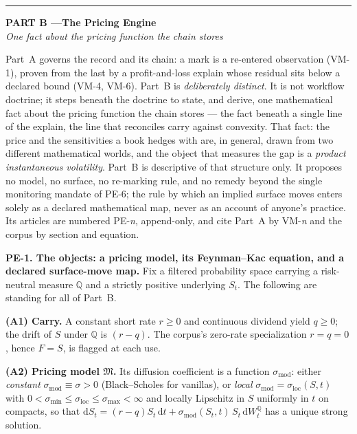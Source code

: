 \documentclass[11pt,a4paper]{article}
\newcommand{\pelabel}[1]{\leavevmode\hypertarget{pe-#1}{}%
  \marginpar{\raggedright\scriptsize\ttfamily\textcolor{gray}{#1}}}
\newcommand{\dd}{\mathrm{d}}
\newcommand{\smod}{\sigma_{\mathrm{mod}}}
\begin{document}
\clearpage
\begin{center}\rule{0.35\linewidth}{0.4pt}\end{center}
\vspace{0.6em}
\begin{center}
{\large\bfseries PART B \quad---\quad The Pricing Engine}\\[0.3em]
{\small\itshape One fact about the pricing function the chain stores}
\end{center}
\vspace{0.4em}

Part~A governs the record and its chain: a mark is a re-entered observation
(VM-1), proven from the last by a profit-and-loss explain whose residual
sits below a declared bound (VM-4, VM-6). Part~B is \emph{deliberately
distinct}. It is not workflow doctrine; it steps beneath the doctrine to
state, and derive, one mathematical fact about the pricing function the
chain stores --- the fact beneath a single line of the explain, the line
that reconciles carry against convexity. That fact: the price and the
sensitivities a book hedges with are, in general, drawn from two different
mathematical worlds, and the object that measures the gap is a
\emph{product instantaneous volatility}. Part~B is descriptive of that
structure only. It proposes no model, no surface, no re-marking rule, and
no remedy beyond the single monitoring mandate of PE-6; the rule by which
an implied surface moves enters solely as a declared mathematical map,
never as an account of anyone's practice. Its articles are numbered
PE-\emph{n}, append-only, and cite Part~A by VM-\emph{n} and the corpus by
section and equation.

\pelabel{PE-1}\textbf{PE-1. The objects: a pricing model, its Feynman--Kac
equation, and a declared surface-move map.} Fix a filtered probability space
carrying a risk-neutral measure $\mathbb{Q}$ and a strictly positive
underlying $S_t$. The following are standing for all of Part~B.

\textbf{(A1) Carry.} A constant short rate $r \ge 0$ and continuous dividend
yield $q \ge 0$; the drift of $S$ under $\mathbb{Q}$ is $(r-q)$. The corpus's
zero-rate specialization $r=q=0$, hence $F=S$, is flagged at each use.

\textbf{(A2) Pricing model $\mathfrak{M}$.} Its diffusion coefficient is a
function $\smod$: either \emph{constant} $\smod \equiv \sigma > 0$
(Black--Scholes for vanillas), or \emph{local} $\smod = \sigma_{\mathrm{loc}}(S,t)$
with $0 < \sigma_{\min} \le \sigma_{\mathrm{loc}} \le \sigma_{\max} < \infty$
and locally Lipschitz in $S$ uniformly in $t$ on compacts, so that
$\dd S_t = (r-q)S_t\,\dd t + \smod(S_t,t)\,S_t\,\dd W_t^{\mathbb Q}$ has a unique
strong solution.
\end{document}
